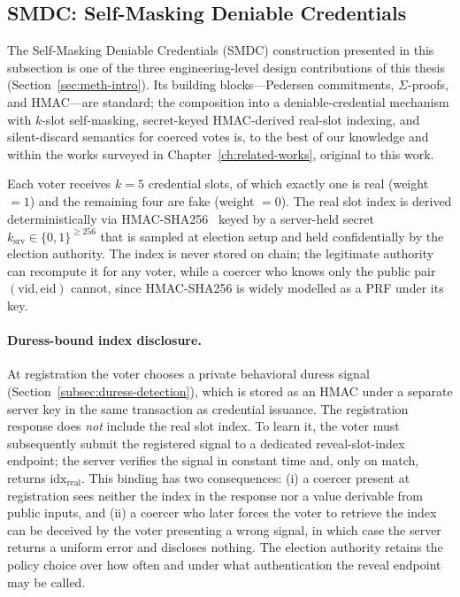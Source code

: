 \subsection{SMDC: Self-Masking Deniable Credentials}
\label{subsec:smdc}

The Self-Masking Deniable Credentials (SMDC) construction presented in this subsection is one of the three engineering-level design contributions of this thesis (Section~\ref{sec:meth-intro}). Its building blocks---Pedersen commitments, $\Sigma$-proofs, and HMAC---are standard; the composition into a deniable-credential mechanism with $k$-slot self-masking, secret-keyed HMAC-derived real-slot indexing, and silent-discard semantics for coerced votes is, to the best of our knowledge and within the works surveyed in Chapter~\ref{ch:related-works}, original to this work.

Each voter receives $k = 5$ credential slots, of which exactly one is real (weight $= 1$) and the remaining four are fake (weight $= 0$). The real slot index is derived deterministically via HMAC-SHA256~\cite{rfc2104,nist_fips198} keyed by a server-held secret $k_{\text{srv}} \in \{0,1\}^{\geq 256}$ that is sampled at election setup and held confidentially by the election authority. The index is never stored on chain; the legitimate authority can recompute it for any voter, while a coercer who knows only the public pair $(\text{vid}, \text{eid})$ cannot, since HMAC-SHA256 is widely modelled as a PRF under its key.

\paragraph{Duress-bound index disclosure.} At registration the voter chooses a private behavioral duress signal (Section~\ref{subsec:duress-detection}), which is stored as an HMAC under a separate server key in the same transaction as credential issuance. The registration response does \emph{not} include the real slot index. To learn it, the voter must subsequently submit the registered signal to a dedicated reveal-slot-index endpoint; the server verifies the signal in constant time and, only on match, returns $\text{idx}_{\text{real}}$. This binding has two consequences: (i) a coercer present at registration sees neither the index in the response nor a value derivable from public inputs, and (ii) a coercer who later forces the voter to retrieve the index can be deceived by the voter presenting a wrong signal, in which case the server returns a uniform error and discloses nothing. The election authority retains the policy choice over how often and under what authentication the reveal endpoint may be called.


